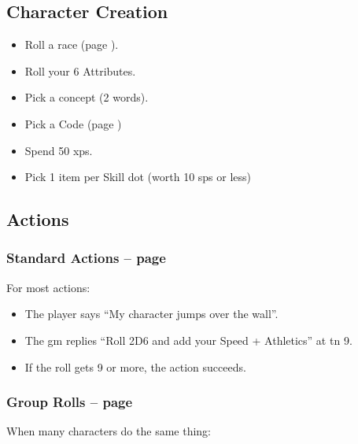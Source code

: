 \begin{multicols}{2}

\subsection{Character Creation}

\begin{itemize}

  \item
  Roll a race (page \pageref{raceRoll}).
  \item
  Roll your 6 Attributes.
  \item
  Pick a concept (2 words).
  \item
  Pick a Code (page \pageref{gods_codes})
  \item
  Spend 50 \glspl{xp}.
  \item
  Pick 1 item per Skill dot (worth 10 \glspl{sp} or less)

\end{itemize}

\subsection{Actions}

\subsubsection{Standard Actions -- page \pageref{basicaction}}

For most actions:

\begin{itemize}

  \item
  The player says ``My character jumps over the wall''.
  \item
  The \gls{gm} replies ``Roll 2D6 and add your Speed + Athletics'' at \gls{tn} 9.
  \item
  If the roll gets 9 or more, the action succeeds.

\end{itemize}

\subsubsection{Group Rolls -- page \pageref{grouproll}}

When many characters do the same thing:

\begin{itemize}


\end{itemize}
\end{multicols}
